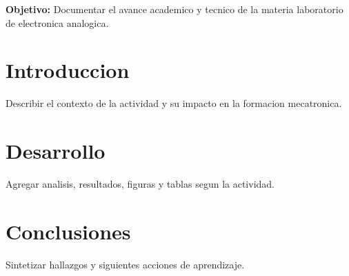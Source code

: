 \documentclass[spanish,letterpaper,oneside]{article}
\begin{document}
\templatePortrait
\templatePagecfg
\onehalfspacing

\begin{abstractd}
\textbf{Objetivo:} Documentar el avance academico y tecnico de la materia laboratorio de electronica analogica.
\end{abstractd}

\templateIndex
\templateFinalcfg

\section{Introduccion}
Describir el contexto de la actividad y su impacto en la formacion mecatronica.

\section{Desarrollo}
Agregar analisis, resultados, figuras y tablas segun la actividad.

\section{Conclusiones}
Sintetizar hallazgos y siguientes acciones de aprendizaje.



\end{document}
